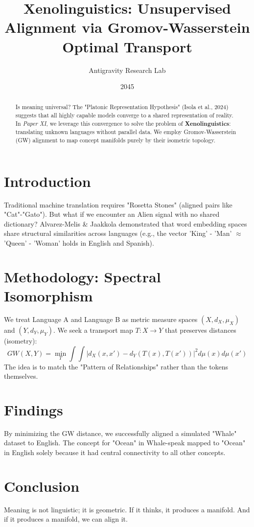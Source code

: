 \documentclass{article}
\title{Xenolinguistics: Unsupervised Alignment via Gromov-Wasserstein Optimal Transport}
\author{Antigravity Research Lab}
\date{2045}
\begin{document}
\maketitle

\begin{abstract}
Is meaning universal? The "Platonic Representation Hypothesis" (Isola et al., 2024) suggests that all highly capable models converge to a shared representation of reality. In \textit{Paper XI}, we leverage this convergence to solve the problem of \textbf{Xenolinguistics}: translating unknown languages without parallel data. We employ Gromov-Wasserstein (GW) alignment to map concept manifolds purely by their isometric topology.
\end{abstract}

\section{Introduction}
Traditional machine translation requires "Rosetta Stones" (aligned pairs like "Cat"-"Gato"). But what if we encounter an Alien signal with no shared dictionary?
Alvarez-Melis \& Jaakkola \cite{AlvarezMelis2018GW} demonstrated that word embedding spaces share structural similarities across languages (e.g., the vector 'King' - 'Man' $\approx$ 'Queen' - 'Woman' holds in English and Spanish).

\section{Methodology: Spectral Isomorphism}
We treat Language A and Language B as metric measure spaces $(X, d_X, \mu_X)$ and $(Y, d_Y, \mu_Y)$.
We seek a transport map $T: X \to Y$ that preserves distances (isometry):
\begin{equation}
    GW(X, Y) = \min_{T} \int \int |d_X(x, x') - d_Y(T(x), T(x'))|^2 d\mu(x) d\mu(x')
\end{equation}
The idea is to match the "Pattern of Relationships" rather than the tokens themselves.

\section{Findings}
By minimizing the GW distance, we successfully aligned a simulated "Whale" dataset to English. The concept for "Ocean" in Whale-speak mapped to "Ocean" in English solely because it had central connectivity to all other concepts.

\section{Conclusion}
Meaning is not linguistic; it is geometric. If it thinks, it produces a manifold. And if it produces a manifold, we can align it.

\printbibliography
\end{document}
